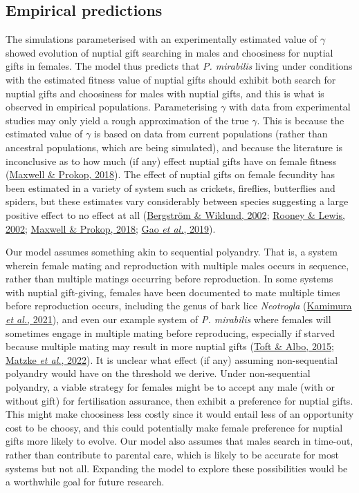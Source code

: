 \documentclass[
]{article}
\begin{document}
\hypertarget{empirical-predictions}{%
\subsection{Empirical predictions}\label{empirical-predictions}}

The simulations parameterised with an experimentally estimated value of
\(\gamma\) showed evolution of nuptial gift searching in males and
choosiness for nuptial gifts in females. The model thus predicts that
\emph{P. mirabilis} living under conditions with the estimated fitness
value of nuptial gifts should exhibit both search for nuptial gifts and
choosiness for males with nuptial gifts, and this is what is observed in
empirical populations. Parameterising \(\gamma\) with data from
experimental studies may only yield a rough approximation of the true
\(\gamma\). This is because the estimated value of \(\gamma\) is based
on data from current populations (rather than ancestral populations,
which are being simulated), and because the literature is inconclusive
as to how much (if any) effect nuptial gifts have on female fitness
(\protect\hyperlink{ref-Maxwell2018}{Maxwell \& Prokop, 2018}). The
effect of nuptial gifts on female fecundity has been estimated in a
variety of system such as crickets, fireflies, butterflies and spiders,
but these estimates vary considerably between species suggesting a large
positive effect to no effect at all
(\protect\hyperlink{ref-Bergstrom2002}{Bergström \& Wiklund, 2002};
\protect\hyperlink{ref-Rooney2002}{Rooney \& Lewis, 2002};
\protect\hyperlink{ref-Maxwell2018}{Maxwell \& Prokop, 2018};
\protect\hyperlink{ref-Gao2019}{Gao \emph{et al.}, 2019}).

Our model assumes something akin to sequential polyandry. That is, a
system wherein female mating and reproduction with multiple males occurs
in sequence, rather than multiple matings occurring before reproduction.
In some systems with nuptial gift-giving, females have been documented
to mate multiple times before reproduction occurs, including the genus
of bark lice \emph{Neotrogla}
(\protect\hyperlink{ref-Kamimura2021}{Kamimura \emph{et al.}, 2021}),
and even our example system of \emph{P. mirabilis} where females will
sometimes engage in multiple mating before reproducing, especially if
starved because multiple mating may result in more nuptial gifts
(\protect\hyperlink{ref-Toft2015}{Toft \& Albo, 2015};
\protect\hyperlink{ref-Matzke2022}{Matzke \emph{et al.}, 2022}). It is
unclear what effect (if any) assuming non-sequential polyandry would
have on the threshold we derive. Under non-sequential polyandry, a
viable strategy for females might be to accept any male (with or without
gift) for fertilisation assurance, then exhibit a preference for nuptial
gifts. This might make choosiness less costly since it would entail less
of an opportunity cost to be choosy, and this could potentially make
female preference for nuptial gifts more likely to evolve. Our model
also assumes that males search in time-out, rather than contribute to
parental care, which is likely to be accurate for most systems but not
all. Expanding the model to explore these possibilities would be a
worthwhile goal for future research.
\end{document}
